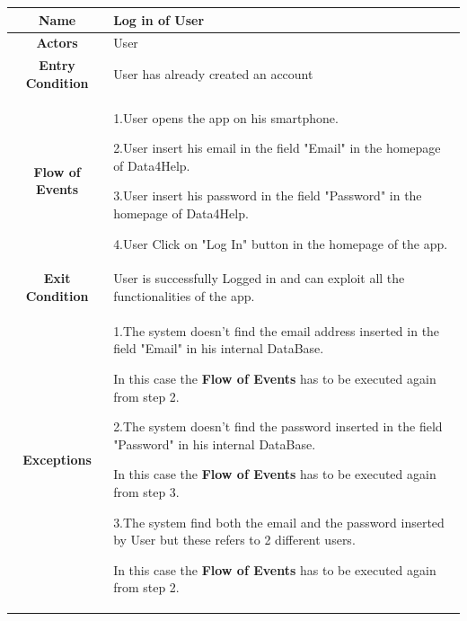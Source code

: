       \begin{table}[h!]
        \centering
        \begin{tabularx}{\linewidth}{|c|X|}
          \hline

          \textbf{Name} & Log in of User \\
        	\hline

        	\textbf{Actors} & User \\
        	\hline

        	\textbf{Entry Condition} & User has already created an account\\
        	\hline

        	\textbf{Flow of Events} & 1.User opens the app on his smartphone.

        					2.User insert his email in the field "Email" in the homepage of Data4Help.

        					3.User insert his password in the field "Password" in the homepage of Data4Help.

        					4.User Click on "Log In" button in the homepage of the app.\\
        	\hline

        	\textbf{Exit Condition} & User is successfully Logged in and can exploit all the functionalities of the app. \\
        	\hline

        	\textbf{Exceptions} & 1.The system doesn't find the email address inserted in the field "Email" in his internal DataBase.

        				In this case the \textbf{Flow of Events} has to be executed again from step 2.

        				2.The system doesn't find the password inserted in the field "Password" in his internal DataBase.

        				 In this case the \textbf{Flow of Events} has to be executed again from step 3.

        				3.The system find both the email and the password inserted by User but these refers to 2 different users.

        				In this case the \textbf{Flow of Events} has to be executed again from step 2. \\
          \hline
        \end{tabularx}
      \end{table}



